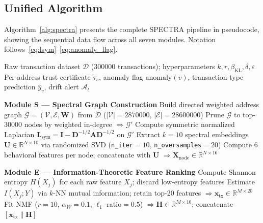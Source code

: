 \subsection{Unified Algorithm}
\label{sec:algorithm}

Algorithm~\ref{alg:spectra} presents the complete \textsc{SPECTRA} pipeline
in pseudocode, showing the sequential data flow across all seven modules.
Notation follows~\eqref{eq:lsym}--\eqref{eq:anomaly_flag}.

\begin{algorithm}[t]
\caption{\textsc{SPECTRA} — Spectral-Probabilistic Ensemble Clustering for
         Transaction Recognition and Authentication}
\label{alg:spectra}
\begin{algorithmic}[1]
\Require Raw transaction dataset $\mathcal{D}$ (\num{300000} transactions);
         hyperparameters $k, r, \beta_{\mathrm{KL}}, \delta, \varepsilon$
\Ensure  Per-address trust certificate $\tilde{\tau}_v$,
         anomaly flag $\mathrm{anomaly}(v)$,
         transaction-type prediction $\hat{y}_v$,
         drift alert $\mathcal{A}_t$

\Statex
\Statex \textbf{Module S — Spectral Graph Construction}
\State Build directed weighted address graph
       $\mathcal{G}=(\mathcal{V},\mathcal{E},\mathbf{W})$
       from $\mathcal{D}$\quad
       ($|\mathcal{V}|=\num{2870000}$, $|\mathcal{E}|=\num{28600000}$)
\State Prune $\mathcal{G}$ to top-\num{30000} nodes by weighted in-degree
       $\Rightarrow \mathcal{G}'$
\State Compute symmetric normalized Laplacian
       $\mathbf{L}_{\mathrm{sym}} = \mathbf{I} -
        \mathbf{D}^{-1/2}\mathbf{A}\mathbf{D}^{-1/2}$
       on $\mathcal{G}'$
\State Extract $k=10$ spectral embeddings
       $\mathbf{U} \in \mathbb{R}^{N \times 10}$
       via randomized SVD (\texttt{n\_iter}$=10$, \texttt{n\_oversamples}$=20$)
\State Compute 6 behavioral features per node; concatenate with $\mathbf{U}$
       $\Rightarrow \mathbf{X}_{\mathrm{node}} \in \mathbb{R}^{N \times 16}$

\Statex
\Statex \textbf{Module E — Information-Theoretic Feature Ranking}
\State Compute Shannon entropy $H(X_j)$ for each raw feature $X_j$;
       discard low-entropy features
\State Estimate $I(X_j; Y)$ via $k$-NN mutual information;
       retain top-20 features
       $\Rightarrow \mathbf{x}_{\mathrm{tx}} \in \mathbb{R}^{M \times 20}$
\State Fit NMF ($r=10$, $\alpha_W=0.1$, $\ell_1$-ratio$=0.5$)
       $\Rightarrow \mathbf{H} \in \mathbb{R}^{M \times 10}$;
       concatenate $[\mathbf{x}_{\mathrm{tx}} \| \mathbf{H}]$


\end{algorithmic}
\end{algorithm}
